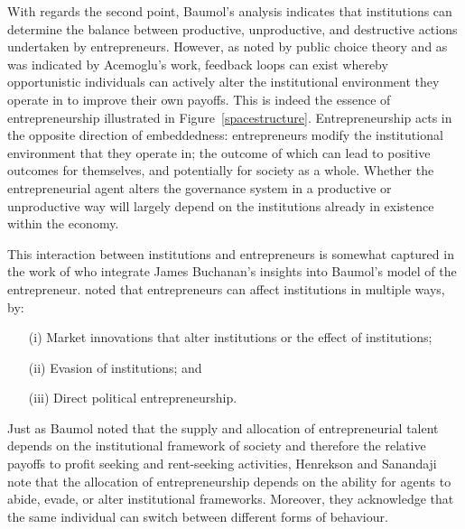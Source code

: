 With regards the second point, Baumol's analysis indicates that institutions can determine the balance between productive, unproductive, and destructive actions undertaken by entrepreneurs. However, as noted by public choice theory and as was indicated by Acemoglu's work, feedback loops can exist whereby opportunistic individuals can actively alter the institutional environment they operate in to improve their own payoffs. This is indeed the essence of entrepreneurship illustrated in Figure~\ref{spacestructure}. Entrepreneurship acts in the opposite direction of embeddedness: entrepreneurs modify the institutional environment that they operate in; the outcome of which can lead to positive outcomes for themselves, and potentially for society as a whole. Whether the entrepreneurial agent alters the governance system in a productive or unproductive way will largely depend on the institutions already in existence within the economy.

This interaction between institutions and entrepreneurs is somewhat captured in the work of \citet{HenreksonSanandaji2011} who integrate James Buchanan's insights into Baumol's model of the entrepreneur. \citet{Buchanan1980} noted that entrepreneurs can affect institutions in multiple ways, by: 
\begin{itemize}
\item[(i)] Market innovations that alter institutions or the effect of institutions; 
\item[(ii)] Evasion of institutions; and 
\item[(iii)] Direct political entrepreneurship. 
\end{itemize}
Just as Baumol noted that the supply and allocation of entrepreneurial talent depends on the institutional framework of society and therefore the relative payoffs to profit seeking and rent-seeking activities, Henrekson and Sanandaji note that the allocation of entrepreneurship depends on the ability for agents to abide, evade, or alter institutional frameworks. Moreover, they acknowledge that the same individual can switch between different forms of behaviour.

